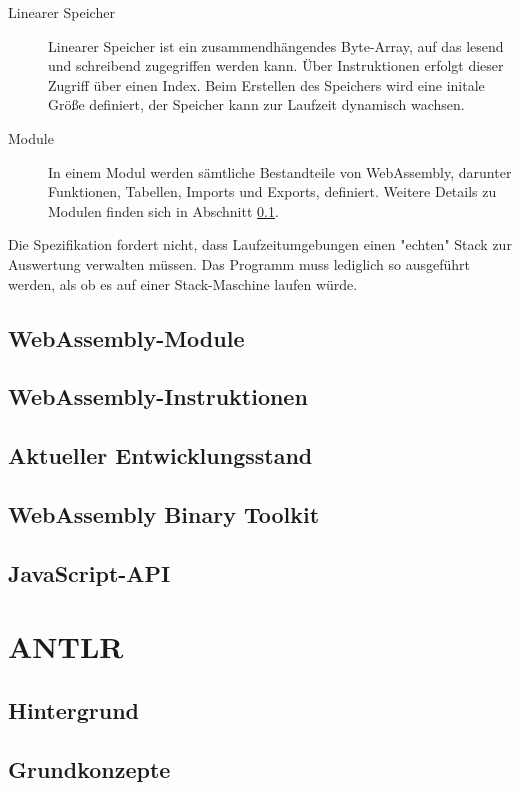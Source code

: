 \begin{description}
    \item[Linearer Speicher] Linearer Speicher ist ein zusammendhängendes Byte-Array, auf das lesend und schreibend zugegriffen werden kann. Über Instruktionen erfolgt dieser Zugriff über einen Index. Beim Erstellen des Speichers wird eine initale Größe definiert, der Speicher kann zur Laufzeit dynamisch wachsen.
    \item[Module] In einem Modul werden sämtliche Bestandteile von WebAssembly, darunter Funktionen, Tabellen, Imports und Exports, definiert. Weitere Details zu Modulen finden sich in Abschnitt \ref{subsec:WebAssembly-Module}.
\end{description}

Die Spezifikation fordert nicht, dass Laufzeitumgebungen einen "echten" Stack zur Auswertung verwalten müssen. Das Programm muss lediglich so ausgeführt werden, als ob es auf einer Stack-Maschine laufen würde.

\subsection{WebAssembly-Module}
\label{subsec:WebAssembly-Module}
\subsection{WebAssembly-Instruktionen}
\label{subsec:WebAssembly-Instruktionen}
\subsection{Aktueller Entwicklungsstand}
\subsection{WebAssembly Binary Toolkit}
\subsection{JavaScript-API}

\section{ANTLR}
\subsection{Hintergrund}
\subsection{Grundkonzepte}
